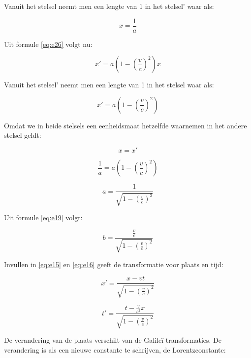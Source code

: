 Vanuit het stelsel neemt men een lengte van 1 in het stelsel' waar
als:

\begin{equation}
x=\frac{1}{a}
\end{equation}


Uit formule \ref{eq:e26} volgt nu:

\begin{equation}
x'=a\left(1-\left(\frac{v}{c}\right)^{2}\right)x
\end{equation}


Vanuit het stelsel' neemt men een lengte van 1 in het stelsel waar
als:

\begin{equation}
x'=a\left(1-\left(\frac{v}{c}\right)^{2}\right)
\end{equation}


Omdat we in beide stelsels een eenheidsmaat hetzelfde waarnemen in
het andere stelsel geldt:

\begin{equation}
x=x'
\end{equation}


\begin{equation}
\frac{1}{a}=a\left(1-\left(\frac{v}{c}\right)^{2}\right)
\end{equation}


\begin{equation}
a=\frac{1}{\sqrt{1-\left(\frac{v}{c}\right)^{2}}}
\end{equation}


Uit formule \ref{eq:e19} volgt:

\begin{equation}
b=\frac{\frac{v}{c}}{\sqrt{1-\left(\frac{v}{c}\right)^{2}}}
\end{equation}


Invullen in \ref{eq:e15} en \ref{eq:e16} geeft de transformatie
voor plaats en tijd:

\begin{equation}
x'=\frac{x-vt}{\sqrt{1-\left(\frac{v}{c}\right)^{2}}}
\end{equation}


\begin{equation}
t'=\frac{t-\frac{v}{c^{2}}x}{\sqrt{1-\left(\frac{v}{c}\right)^{2}}}
\end{equation}


De verandering van de plaats verschilt van de Galileï transformaties.
De verandering is als een nieuwe constante te schrijven, de Lorentzconstante:

